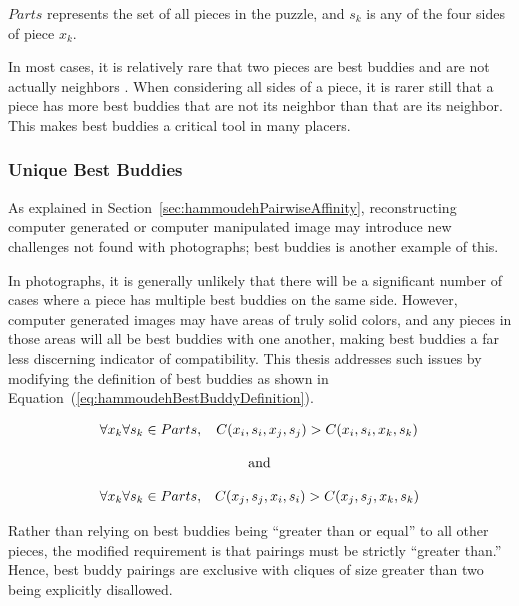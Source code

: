 \documentclass{report}
\def\eref#1{(\ref{#1})}
\begin{document}
\noindent
$Parts$ represents the set of all pieces in the puzzle, and $s_k$ is any of the four sides of piece $x_k$.

In most cases, it is relatively rare that two pieces are best buddies and are not actually neighbors \cite{paikin2015}.  When considering all sides of a piece, it is rarer still that a piece has more best buddies that are not its neighbor than that are its neighbor.  This makes best buddies a critical tool in many placers.

\subsubsection{Unique Best Buddies}\label{sec:improvedBestBuddies}

As explained in Section~\ref{sec:hammoudehPairwiseAffinity}, reconstructing computer generated or computer manipulated image may introduce new challenges not found with photographs; best buddies is another example of this.

In photographs, it is generally unlikely that there will be a significant number of cases where a piece has multiple best buddies on the same side.  However, computer generated images may have areas of truly solid colors, and any pieces in those areas will all be best buddies with one another, making best buddies a far less discerning indicator of compatibility.  This thesis addresses such issues by modifying the definition of best buddies as shown in Equation~\eref{eq:hammoudehBestBuddyDefinition}.

\begin{equation} \label{eq:hammoudehBestBuddyDefinition}
\begin{split}
\begin{matrix}
\forall{x_k} \forall{s_k} \in Parts, & C(x_i, s_i, x_j, s_j) > C(x_i, s_i, x_k, s_k)
\\
\\
\multicolumn{2}{c}{\textnormal{and}}
\\
\\
\forall{x_k} \forall{s_k} \in Parts, & C(x_j, s_j, x_i, s_i) > C(x_j, s_j, x_k, s_k)
\end{matrix}
\end{split}
\end{equation}

Rather than relying on best buddies being ``greater than or equal'' to all other pieces, the modified requirement is that pairings must be strictly ``greater than.''  Hence, best buddy pairings are exclusive with cliques of size greater than two being explicitly disallowed.
\end{document}
